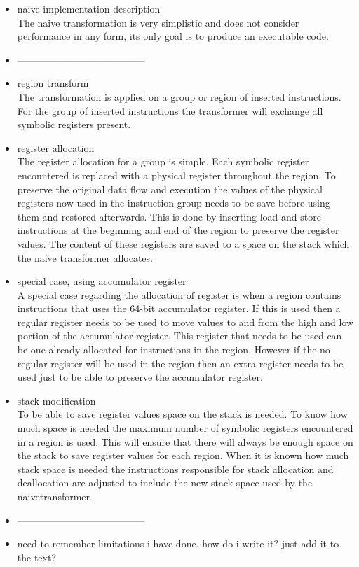 \begin{itemize}
    \item naive implementation description \\
The naive transformation is very simplistic and does not consider performance
in any form, its only goal is to produce an executable code.
    \item ---------------------------------------
    \item region transform \\
The transformation is applied on a group or region of inserted instructions.
For the group of inserted instructions the transformer will exchange all
symbolic registers present.
    \item register allocation \\
The register allocation for a group is simple. Each symbolic register encountered
is replaced with a physical register throughout the region. To preserve the original
data flow and execution the values of the physical registers now used in the
instruction group needs to be save before using them and restored afterwards.
This is done by inserting load and store instructions at the beginning and end
of the region to preserve the register values. The content of these registers
are saved to a space on the stack which the naive transformer allocates.
    \item special case, using accumulator register \\
A special case regarding the allocation of register is when a region contains
instructions that uses the 64-bit accumulator register. If this is used
then a regular register needs to be used to move values to and from
the high and low portion of the accumulator register. This register that
needs to be used can be one already allocated for instructions in the
region. However if the no regular register will be used in the region then
an extra register needs to be used just to be able to preserve the accumulator
register.
    \item stack modification \\
To be able to save register values space on the stack is needed. To know
how much space is needed the maximum number of symbolic registers
encountered in a region is used. This will ensure that there will always
be enough space on the stack to save register values for each region.
When it is known how much stack space is needed the instructions
responsible for stack allocation and deallocation are adjusted to
include the new stack space used by the naivetransformer.
    \item ---------------------------------------
    \item need to remember limitations i have done. how do i write it?
just add it to the text?
\end{itemize}




